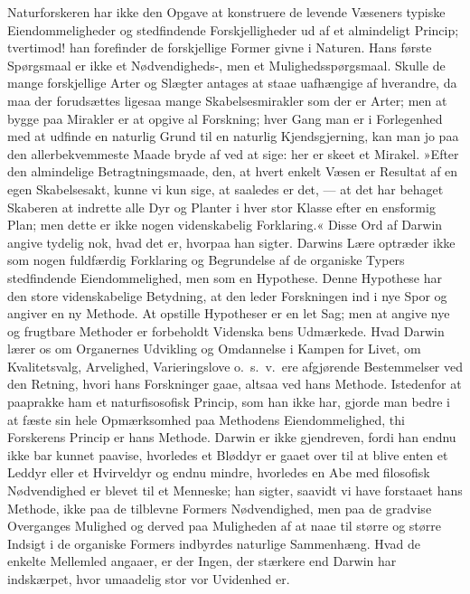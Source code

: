\documentclass[12pt,a4paper]{article}
\newcommand{\apage}[1]{\marginnote{\footnotesize\textit{[#1]}}}
\begin{document}
Naturforskeren har ikke den Opgave at konstruere de levende
Væseners typiske Eiendommeligheder og stedfindende Forskjelligheder ud
af et almindeligt Princip; tvertimod! han forefinder de forskjellige
Former givne i Naturen. Hans første Spørgsmaal er ikke et
Nødvendigheds-, men et Mulighedsspørgsmaal. Skulle de mange forskjellige
Arter og Slægter antages at staae uafhængige af hverandre, da maa der
forudsættes ligesaa mange Skabelsesmirakler som der er Arter; men at
bygge paa Mirakler er at opgive al Forskning; hver Gang man er i
Forlegenhed med at udfinde en naturlig Grund til en naturlig
Kjendsgjerning, kan man jo paa den allerbekvemmeste Maade bryde af ved
at sige: her er skeet et Mirakel. »Efter den almindelige
Betragtningsmaade, den, at hvert enkelt Væsen er Resultat af en egen
Skabelsesakt, kunne vi kun sige, at saaledes er det, --- at det har
behaget Skaberen at indrette alle Dyr og Planter i hver stor Klasse
efter en ensformig Plan; men dette er ikke nogen videnskabelig
Forklaring.«
Disse Ord af Darwin angive tydelig nok, hvad det er, hvorpaa han
sigter. Darwins Lære optræder ikke som nogen fuldfærdig Forklaring og
Begrundelse af de organiske Typers stedfindende Eiendommelighed, men
som en Hypothese. Denne Hypothese har den store videnskabelige
Betydning, at den leder Forskningen ind i nye Spor og angiver en ny
Methode. At opstille Hypotheser er en let Sag; men at angive nye og
frugtbare Methoder er forbeholdt \apage{454}Videnska%
bens Udmærkede. Hvad Darwin lærer os om Organernes Udvikling og
Omdannelse i Kampen for Livet, om Kvalitetsvalg, Arvelighed,
Varieringslove o.\ s.\ v.\ ere afgjørende Bestemmelser ved den
Retning, hvori hans Forskninger gaae, altsaa ved hans Methode.
Istedenfor at paaprakke ham et naturfisosofisk Princip, som han ikke
har, gjorde man bedre i at fæste sin hele Opmærksomhed paa Methodens
Eiendommelighed, thi Forskerens Princip er hans Methode.
Darwin er ikke gjendreven, fordi han endnu ikke bar kunnet paavise,
hvorledes et Bløddyr er gaaet over til at blive enten et Leddyr eller
et Hvirveldyr og endnu mindre, hvorledes en Abe med filosofisk
Nødvendighed er blevet til et Menneske; han sigter, saavidt vi have
forstaaet hans Methode, ikke paa de tilblevne Formers Nødvendighed,
men paa de gradvise Overganges Mulighed og derved paa Muligheden af at
naae til større og større Indsigt i de organiske Formers indbyrdes
naturlige Sammenhæng. Hvad de enkelte Mellemled angaaer, er der Ingen,
der stærkere end Darwin har indskærpet, hvor umaadelig stor vor
Uvidenhed er.
\end{document}
